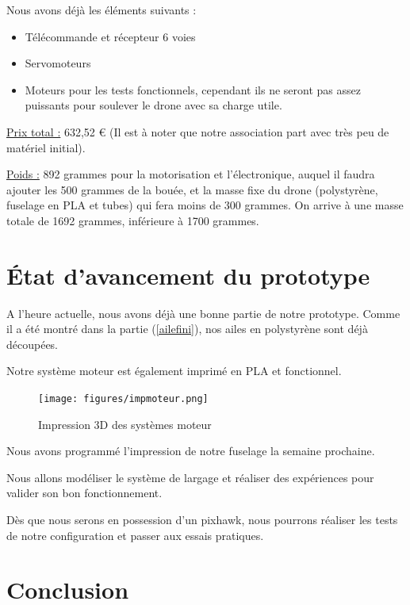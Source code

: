 \documentclass[a4paper,12pt,french]{report}
\begin{document}
Nous avons déjà les éléments suivants :
\begin{itemize}
    \item Télécommande et récepteur 6 voies
    \item Servomoteurs
    \item Moteurs pour les tests fonctionnels, cependant ils ne seront pas assez puissants pour soulever le drone avec sa charge utile.\newline
\end{itemize}

\underline{Prix total :} 632,52 € (Il est à noter que notre association part avec très peu de matériel initial).\newline

\underline{Poids :} 892 grammes pour la motorisation et l’électronique, auquel il faudra ajouter les 500 grammes de la bouée, et la masse fixe du drone (polystyrène, fuselage en PLA et tubes) qui fera moins de 300 grammes. On arrive à une masse totale de 1692 grammes, inférieure à 1700 grammes.

\chapter{État d'avancement du prototype}

A l'heure actuelle, nous avons déjà une bonne partie de notre prototype. Comme il a été montré dans la partie (\ref{ailefini}), nos ailes en polystyrène sont déjà découpées.\newline

Notre système moteur est également imprimé en PLA et fonctionnel.

\begin{figure}[h]
    \centering
    \texttt{[image: figures/impmoteur.png]}
    \caption{Impression 3D des systèmes moteur}
\end{figure}

Nous avons programmé l'impression de notre fuselage la semaine prochaine.\newline

Nous allons modéliser le système de largage et réaliser des expériences pour valider son bon fonctionnement.\newline

Dès que nous serons en possession d'un pixhawk, nous pourrons réaliser les tests de notre configuration et passer aux essais pratiques.

\chapter*{Conclusion}
\end{document}
